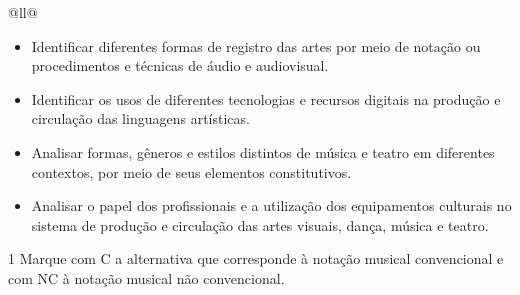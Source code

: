 \begin{itemize}
\begin{itemize}
\begin{escolha}[]{@{}ll@{}}

\begin{itemize}
\item Identificar diferentes formas de registro das artes por meio de
notação ou procedimentos e técnicas de áudio e audiovisual.

\item Identificar os usos de diferentes tecnologias e recursos digitais na
produção e circulação das linguagens artísticas.

\item Analisar formas, gêneros e estilos distintos de música e teatro em
diferentes contextos, por meio de seus elementos constitutivos.

\item Analisar o papel dos profissionais e a utilização dos equipamentos
culturais no sistema de produção e circulação das artes visuais, dança,
música e teatro.
\end{itemize}


\num{1} Marque com C a alternativa que corresponde à notação musical
convencional e com NC à notação musical não convencional.








\end{escolha}
\end{itemize}
\end{itemize}
